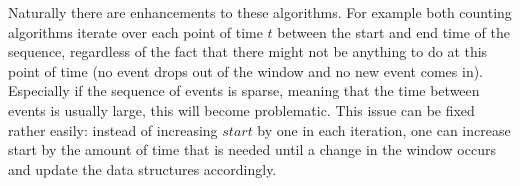 
Naturally there are enhancements to these algorithms. For example both counting algorithms iterate over each point of time $t$ between the start and end time of the sequence, regardless of the fact that there might not be anything to do at this point of time (no event drops out of the window and no new event comes in). Especially if the sequence of events is sparse, meaning that the time between events is usually large, this will become problematic. This issue can be fixed rather easily: instead of increasing $start$ by one in each iteration, one can increase start by the amount of time that is needed until a change in the window occurs and update the data structures accordingly. \newline
